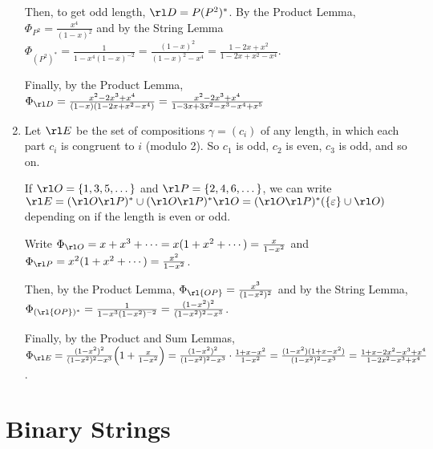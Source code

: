 \documentclass[class=math239,notes]{agony}
\begin{document}
\begin{enumerate}
\begin{sol}
          Then, to get odd length, $\rl D = P(P^2)^*$.
          By the Product Lemma, $\Phi_{P^2} = \frac{x^4}{(1-x)^2}$
          and by the String Lemma $\Phi_{(P^2)^*} = \frac{1}{1-x^4(1-x)^{-2}}
            = \frac{(1-x)^2}{(1-x)^2-x^4} = \frac{1-2x+x^2}{1-2x+x^2-x^4}$.

          Finally, by the Product Lemma, $\Phi_{\rl D} = \frac{x^2-2x^3+x^4}{(1-x)(1-2x+x^2-x^4)}
            = \frac{x^2-2x^3+x^4}{1-3x+3x^2-x^3-x^4+x^5}$
        \end{sol}
  \item Let $\rl E$ be the set of compositions $\gamma = (c_i)$ of any length,
        in which each part $c_i$ is congruent to $i$ (modulo 2).
        So $c_1$ is odd, $c_2$ is even, $c_3$ is odd, and so on.
        \begin{sol}
          If $\rl O = \{1,3,5,\dotsc\}$ and $\rl P = \{2,4,6,\dotsc\}$,
          we can write $\rl E = (\rl O\rl P)^* \cup (\rl O\rl P)^*\rl O
            = (\rl O\rl P)^*(\{\varepsilon\} \cup \rl O)$
          depending on if the length is even or odd.

          Write $\Phi_{\rl O} = x + x^3 + \dotsb = x(1 + x^2 + \dotsb) = \frac{x}{1-x^2}$
          and $\Phi_{\rl P} = x^2(1 + x^2 + \dotsb) = \frac{x^2}{1-x^2}$.

          Then, by the Product Lemma, $\Phi_{\rl{OP}} = \frac{x^3}{(1-x^2)^2}$
          and by the String Lemma, $\Phi_{(\rl{OP})^*} = \frac{1}{1-x^3(1-x^2)^{-2}}
            = \frac{(1-x^2)^2}{(1-x^2)^2-x^3}$.

          Finally, by the Product and Sum Lemmas,
          $\Phi_{\rl E} = \frac{(1-x^2)^2}{(1-x^2)^2-x^3}\qty(1+\frac{x}{1-x^2})
            = \frac{(1-x^2)^2}{(1-x^2)^2-x^3}\cdot\frac{1+x-x^2}{1-x^2}
            = \frac{(1-x^2)(1+x-x^2)}{(1-x^2)^2-x^3}
            = \frac{1+x-2x^2-x^3+x^4}{1-2x^2-x^3+x^4}$.
        \end{sol}
\end{enumerate}

\section{Binary Strings}
\end{document}
